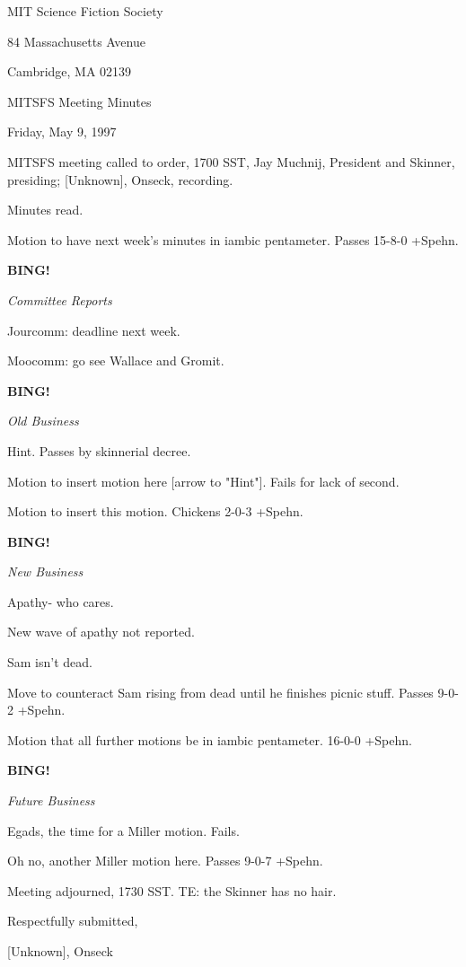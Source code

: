 \documentclass[12pt]{article}
\newcommand{\bing}{{\bf BING!} }
\newcommand{\goto}[1]{\bing \vskip 12pt \centerline{{\em{#1}}}}
\begin{document}
\begin{center}

MIT Science Fiction Society 

84 Massachusetts Avenue

Cambridge, MA 02139

\vspace{12pt}

MITSFS Meeting Minutes 

Friday, May 9, 1997

\end{center}
 
\vspace{18pt}

\setlength{\parskip}{6pt}

\noindent
MITSFS meeting called to order, 1700 SST,
Jay Muchnij, President and Skinner, presiding; [Unknown], Onseck, recording.

Minutes read.

Motion to have next week's minutes in iambic pentameter. Passes 15-8-0 +Spehn.

\goto{Committee Reports}

Jourcomm: deadline next week.

Moocomm: go see Wallace and Gromit.

\goto{Old Business}

Hint. Passes by skinnerial decree.

Motion to insert motion here [arrow to "Hint"]. Fails for lack of second.

Motion to insert this motion. Chickens 2-0-3 +Spehn.

\goto{New Business}

Apathy- who cares.

New wave of apathy not reported.

Sam isn't dead.

Move to counteract Sam rising from dead until he finishes picnic stuff. Passes 9-0-2 +Spehn.

Motion that all further motions be in iambic pentameter. 16-0-0 +Spehn.

\goto{Future Business}

Egads, the time for a Miller motion. Fails.

Oh no, another Miller motion here. Passes 9-0-7 +Spehn.

\vspace{12pt}

\noindent
Meeting adjourned, 1730 SST. TE: the Skinner has no hair.

\vspace{18pt}

\centerline{Respectfully submitted,}
\centerline{[Unknown], Onseck}
\end{document}

